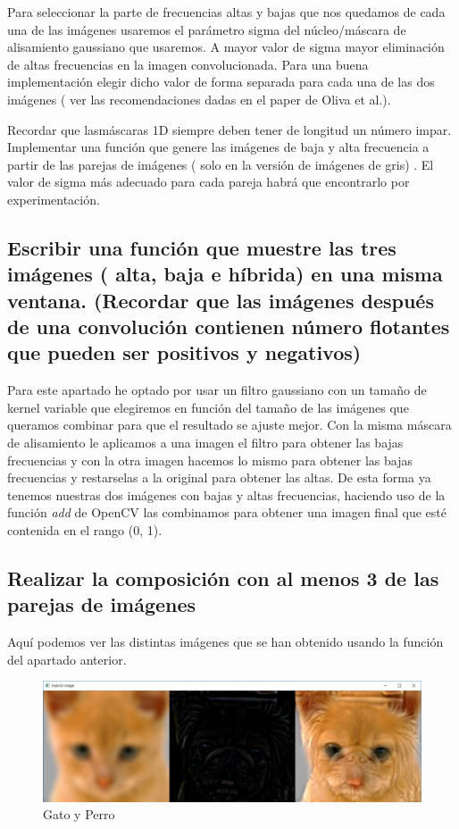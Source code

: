 \documentclass{article}
\begin{document}
Para seleccionar la parte de frecuencias altas y bajas que nos quedamos de cada una de las imágenes usaremos el parámetro sigma del núcleo/máscara de alisamiento gaussiano que usaremos. A mayor valor de sigma mayor eliminación de altas frecuencias en la imagen convolucionada. Para una buena implementación elegir dicho valor de forma separada para cada una de las dos imágenes ( ver las recomendaciones dadas en el paper de Oliva et al.). 

Recordar que lasmáscaras 1D siempre deben tener de longitud un número impar. Implementar una función que genere las imágenes de baja y alta frecuencia a partir de las parejas de imágenes ( solo en la versión de imágenes de gris) . El valor de sigma más adecuado para cada pareja
habrá que encontrarlo por experimentación.


\subsection{Escribir una función que muestre las tres imágenes ( alta, baja e híbrida) en una misma ventana. (Recordar que las imágenes después de una convolución contienen número flotantes que pueden ser positivos y negativos)}


Para este apartado he optado por usar un filtro gaussiano con un tamaño de kernel variable que elegiremos en función del tamaño de las imágenes que queramos combinar para que el resultado se ajuste mejor. 
Con la misma máscara de alisamiento le aplicamos a una imagen el filtro para obtener las bajas frecuencias y con la otra imagen hacemos lo mismo para obtener las bajas frecuencias y restarselas a la original para obtener las altas. De esta forma ya tenemos nuestras dos imágenes con bajas y altas frecuencias, haciendo uso de la función \textit{add} de OpenCV las combinamos para obtener una imagen final que esté contenida en el rango (0, 1).



\newpage
\subsection{ Realizar la composición con al menos 3 de las parejas de imágenes}

Aquí podemos ver las distintas imágenes que se han obtenido usando la función del apartado anterior.

\begin{figure}[h]
\centering
\includegraphics[scale=0.45]{3b1.PNG}
\caption{Gato y Perro}
\end{figure}
\end{document}
